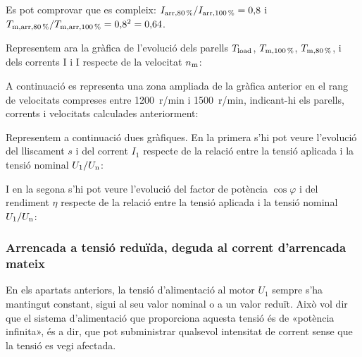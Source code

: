 \begin{exemple}
	Es pot comprovar que es compleix: $I_\mathrm{arr,\SI{80}{\%}} / I_\mathrm{arr,\SI{100}{\%}} = 0{,}8$ i $T_\mathrm{m,arr,\SI{80}{\%}} / T_\mathrm{m,arr,\SI{100}{\%}} = 0{,}8^2 = 0{,}64$.
		
 	Representem ara la gràfica de l'evolució dels parells $T_\mathrm{load}$,  $T_\mathrm{m,\SI{100}{\%}}$,  $T_\mathrm{m,\SI{80}{\%}}$, i dels	corrents I i I respecte de la velocitat $n_\mathrm{m}$:	
    \begin{center}
		\fontsize{10pt}{11pt}\selectfont
		
	\end{center}	

	\vspace{-2mm}
	A continuació es representa una zona ampliada de la gràfica anterior en el rang de velocitats compreses entre \SI{1200}{r/min} i  \SI{1500}{r/min}, indicant-hi els parells, corrents i velocitats calculades anteriorment:

	\begin{center}
		\fontsize{10pt}{11pt}\selectfont
		
	\end{center}

	Representem a continuació dues gràfiques. En la primera s'hi pot veure  l'evolució del lliscament $s$ i del corrent $I_1$ respecte de la relació entre la tensió aplicada i la tensió nominal $U_1/U_\mathrm{n}$:
	\begin{center}
		
	\end{center}
	
	I en la segona s'hi pot veure l'evolució del factor de potència $\cos\varphi$ i del rendiment $\eta$ respecte de la relació entre la tensió aplicada i la tensió nominal $U_1/U_\mathrm{n}$:
	\begin{center}
		
	\end{center}
\end{exemple} 


\subsubsection{Arrencada a tensió reduïda, deguda al  corrent d'arrencada mateix}

En els apartats anteriors, la tensió d'alimentació al motor $U_1$ sempre s'ha mantingut constant, sigui al seu valor nominal o a un valor reduït. Això vol dir que el sistema d'alimentació que proporciona aquesta tensió és de «potència infinita», és a dir, que pot subministrar qualsevol intensitat de corrent sense que la tensió es vegi afectada.

